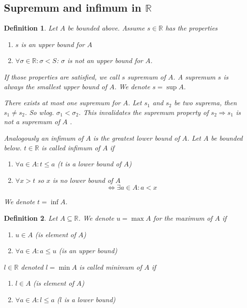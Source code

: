 \documentclass[a4paper,landscape,twocolumn]{article}
\newtheorem{defi}{Definition}
\begin{document}
\subsection{Supremum and infimum in $\mathbb R$}
\begin{defi}
  Let $A$ be bounded above.
  Assume $s \in \mathbb R$ has the properties
  \begin{enumerate}
    \item $s$ is an upper bound for $A$
    \item $\forall \sigma \in \mathbb R: \sigma < S$: $\sigma$ is not an upper bound for $A$.
  \end{enumerate}
  If those properties are satisfied, we call $s$ \emph{supremum of $A$}.
  A supremum $s$ is always the smallest upper bound of $A$.
  We denote $s = \sup{A}$.

  There exists at most one supremum for $A$. Let $s_1$ and $s_2$ be two suprema,
  then $s_1 \neq s_2$. So wlog. $\sigma_1 < \sigma_2$. This invalidates the supremum
  property of $s_2 \Rightarrow s_1$ is not a supremum of $A$ \lightning.

  Analogously an \emph{infimum of $A$} is the greatest lower bound of $A$.
  Let $A$ be bounded below. $t \in \mathbb R$ is called \emph{infimum of $A$}
  if
  \begin{enumerate}
    \item $\forall a \in A: t \leq a$ (t is a lower bound of $A$)
    \item $\forall x > t$ so $x$ is no lower bound of $A$
      \[ \Leftrightarrow \exists a \in A: a < x \]
  \end{enumerate}
  We denote $t = \inf{A}$.
\end{defi}

\begin{defi}
  Let $A \subseteq \mathbb R$. We denote $u = \max{A}$ for the \emph{maximum of $A$} if
  \begin{enumerate}
    \item $u \in A$ (is element of $A$)
    \item $\forall a \in A: a \leq u$ (is an upper bound)
  \end{enumerate}
  $l \in \mathbb R$ denoted $l = \min{A}$ is called minimum of $A$ if
  \begin{enumerate}
    \item $l \in A$ (is element of $A$)
    \item $\forall a \in A: l \leq a$ ($l$ is a lower bound)
  \end{enumerate}
\end{defi}
\end{document}
